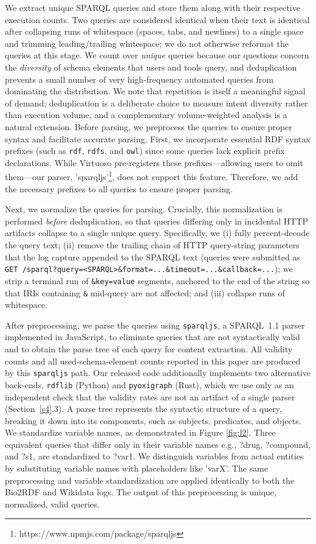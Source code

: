 \documentclass[sw]{iosart2x}
\begin{document}
We extract unique SPARQL queries and store them along with their respective execution counts. Two queries are considered identical when their text is identical after collapsing runs of whitespace (spaces, tabs, and newlines) to a single space and trimming leading/trailing whitespace; we do not otherwise reformat the queries at this stage. We count over \emph{unique} queries because our questions concern the \emph{diversity} of schema elements that users and tools query, and deduplication prevents a small number of very high-frequency automated queries from dominating the distribution. We note that repetition is itself a meaningful signal of demand; deduplication is a deliberate choice to measure intent diversity rather than execution volume, and a complementary volume-weighted analysis is a natural extension. Before parsing, we preprocess the queries to ensure proper syntax and facilitate accurate parsing. First, we incorporate essential RDF syntax prefixes (such as \texttt{rdf}, \texttt{rdfs}, and \texttt{owl}) since some queries lack explicit prefix declarations. While Virtuoso pre-registers these prefixes—allowing users to omit them—our parser, 'sparqljs'\footnote{https://www.npmjs.com/package/sparqljs}, does not support this feature. Therefore, we add the necessary prefixes to all queries to ensure proper parsing.

Next, we normalize the queries for parsing. Crucially, this normalization is performed \emph{before} deduplication, so that queries differing only in incidental HTTP artifacts collapse to a single unique query. Specifically, we (i) fully percent-decode the query text; (ii) remove the trailing chain of HTTP query-string parameters that the log capture appended to the SPARQL text (queries were submitted as \texttt{GET /sparql?query=<SPARQL>\&format=...\&timeout=...\&callback=...}); we strip a terminal run of \texttt{\&key=value} segments, anchored to the end of the string so that IRIs containing \texttt{\&} mid-query are not affected; and (iii) collapse runs of whitespace.


After preprocessing, we parse the queries using \texttt{sparqljs}, a SPARQL~1.1 parser implemented in JavaScript, to eliminate queries that are not syntactically valid and to obtain the parse tree of each query for content extraction. All validity counts and all used-schema-element counts reported in this paper are produced by this \texttt{sparqljs} path. Our released code additionally implements two alternative back-ends, \texttt{rdflib} (Python) and \texttt{pyoxigraph} (Rust), which we use only as an independent check that the validity rates are not an artifact of a single parser (Section~\ref{s4}.3). A parse tree represents the syntactic structure of a query, breaking it down into its components, such as subjects, predicates, and objects. We standardize variable names, as demonstrated in Figure \ref{fig:l2}. Three equivalent queries that differ only in their variable names e.g., ?drug, ?compound, and ?s1, are standardized to ?var1. We distinguish variables from actual entities by substituting variable names with placeholders like 'varX'. The same preprocessing and variable standardization are applied identically to both the Bio2RDF and Wikidata logs. The output of this preprocessing is unique, normalized, valid queries.
\end{document}
